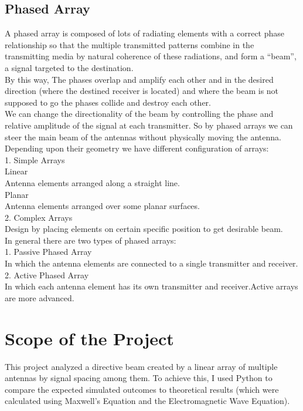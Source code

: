\subsection{Phased Array}
A phased array is composed of lots of radiating elements with a correct phase relationship so that the multiple transmitted patterns combine in the transmitting media by natural coherence of these radiations, and form a “beam”, a signal targeted to the destination.\\
By this way, The phases overlap and amplify each other and in the desired direction (where the destined receiver is located) and where the beam is not supposed to go the phases collide and destroy each other.\\
We can change the directionality of the beam by controlling the phase and relative amplitude of the signal at each transmitter. So by phased arrays we can steer the main beam of the antennas without physically moving the antenna.\\
Depending upon their geometry we have different configuration of arrays:\\
1. Simple Arrays\\
 Linear\\
  Antenna elements arranged along a straight line.\\
 Planar\\
  Antenna elements arranged over some planar surfaces.\\
2. Complex Arrays\\
Design by placing elements on certain specific position to get desirable beam.\\
In general there are two types of phased arrays:\\
1. Passive Phased Array\\
In which the antenna elements are connected to a single transmitter and receiver.\\
2. Active Phased Array\\
In which each antenna element has its own transmitter and receiver.Active arrays are more advanced.

\section{Scope of the Project}

This project analyzed a directive beam created by a linear array of multiple antennas by signal spacing among them. 
To achieve this, I used Python to compare the expected simulated outcomes to theoretical results (which were calculated using Maxwell's Equation and the Electromagnetic Wave Equation).
